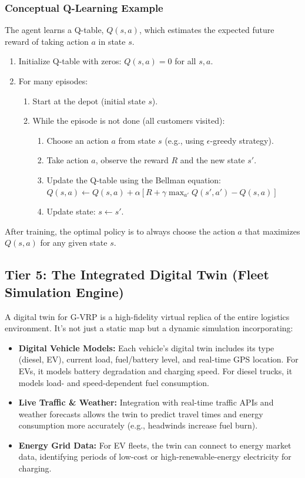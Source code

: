 \documentclass{article}
\begin{document}
\subsubsection{Conceptual Q-Learning Example}
The agent learns a Q-table, $Q(s, a)$, which estimates the expected future reward of taking action $a$ in state $s$.
\begin{enumerate}
    \item Initialize Q-table with zeros: $Q(s, a)=0$ for all $s, a$.
    \item For many episodes:
    \begin{enumerate}
        \item Start at the depot (initial state $s$).
        \item While the episode is not done (all customers visited):
        \begin{enumerate}
            \item Choose an action $a$ from state $s$ (e.g., using $\epsilon$-greedy strategy).
            \item Take action $a$, observe the reward $R$ and the new state $s'$.
            \item Update the Q-table using the Bellman equation:
            $Q(s, a) \leftarrow Q(s, a) + \alpha [R + \gamma \max_{a'} Q(s', a') - Q(s, a)]$
            \item Update state: $s \leftarrow s'$.
        \end{enumerate}
    \end{enumerate}
\end{enumerate}
After training, the optimal policy is to always choose the action $a$ that maximizes $Q(s,a)$ for any given state $s$.

\subsection{Tier 5: The Integrated Digital Twin (Fleet Simulation Engine)}
A digital twin for G-VRP is a high-fidelity virtual replica of the entire logistics environment. It's not just a static map but a dynamic simulation incorporating:
\begin{itemize}
\item \textbf{Digital Vehicle Models:} Each vehicle's digital twin includes its type (diesel, EV), current load, fuel/battery level, and real-time GPS location. For EVs, it models battery degradation and charging speed. For diesel trucks, it models load- and speed-dependent fuel consumption.
\item \textbf{Live Traffic \& Weather:} Integration with real-time traffic APIs and weather forecasts allows the twin to predict travel times and energy consumption more accurately (e.g., headwinds increase fuel burn).
\item \textbf{Energy Grid Data:} For EV fleets, the twin can connect to energy market data, identifying periods of low-cost or high-renewable-energy electricity for charging.
\end{itemize}
\end{document}
